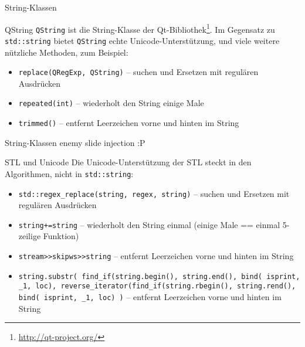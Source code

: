 \begin{frame}{String-Klassen}
    \begin{block}{QString}
    \texttt{QString} ist die String-Klasse der Qt-Bibliothek\footnote{\url{http://qt-project.org/}}. Im Gegensatz zu \texttt{std::string} bietet \texttt{QString} echte Unicode-Unterstützung, und viele weitere nützliche Methoden, zum Beispiel:
    \begin{itemize}
    \item \texttt{replace(QRegExp, QString)} -- suchen und Ersetzen mit regulären Ausdrücken
    \item \texttt{repeated(int)} -- wiederholt den String einige Male
    \item \texttt{trimmed()} -- entfernt Leerzeichen vorne und hinten im String
    \end{itemize}
    \end{block}
\end{frame}

\begin{frame}{String-Klassen}
	enemy slide injection :P
	
    \begin{block}{STL und Unicode}
    Die Unicode-Unterstützung der STL steckt in den Algorithmen, nicht in \texttt{std::string}:
    \begin{itemize}
    \item \texttt{std::regex\_replace(string, regex, string)} -- suchen und Ersetzen mit regulären Ausdrücken
    \item \texttt{string+=string} -- wiederholt den String einmal (einige Male == einmal 5-zeilige Funktion)
    \item \texttt{stream>>skipws>>string} -- entfernt Leerzeichen vorne und hinten im String
	\tiny
	\item \texttt{string.substr( find\_if(string.begin(), string.end(), bind( isprint, \_1, loc), reverse\_iterator(find\_if(string.rbegin(), string.rend(), bind( isprint, \_1, loc) )} -- entfernt Leerzeichen vorne und hinten im String
    \end{itemize}
    \end{block}
\end{frame}
